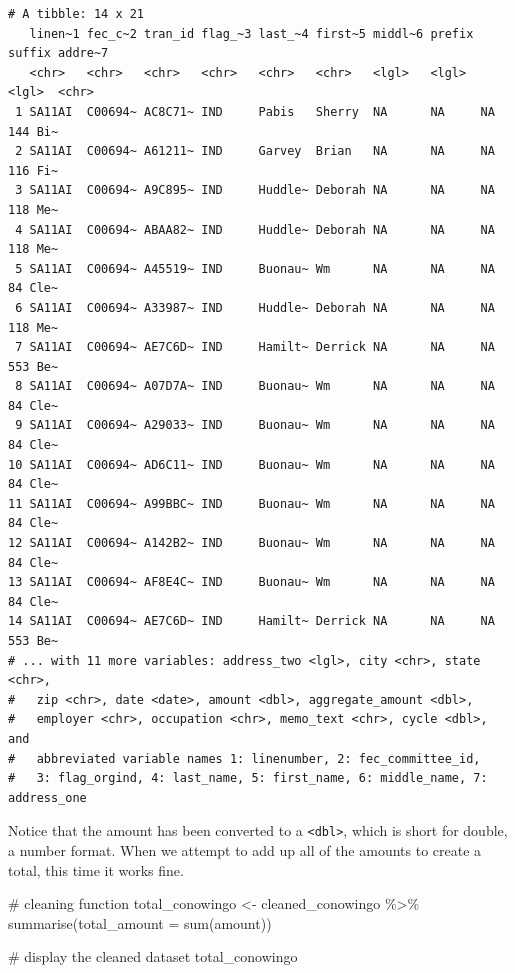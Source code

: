 \documentclass[
  letterpaper,
  DIV=11,
  numbers=noendperiod]{scrreprt}
\newenvironment{Shaded}{\begin{snugshade}}{\end{snugshade}}
\newcommand{\AttributeTok}[1]{\textcolor[rgb]{0.40,0.45,0.13}{#1}}
\newcommand{\CommentTok}[1]{\textcolor[rgb]{0.37,0.37,0.37}{#1}}
\newcommand{\FunctionTok}[1]{\textcolor[rgb]{0.28,0.35,0.67}{#1}}
\newcommand{\NormalTok}[1]{\textcolor[rgb]{0.00,0.23,0.31}{#1}}
\newcommand{\OtherTok}[1]{\textcolor[rgb]{0.00,0.23,0.31}{#1}}
\newcommand{\SpecialCharTok}[1]{\textcolor[rgb]{0.37,0.37,0.37}{#1}}
\begin{document}
\begin{verbatim}
# A tibble: 14 x 21
   linen~1 fec_c~2 tran_id flag_~3 last_~4 first~5 middl~6 prefix suffix addre~7
   <chr>   <chr>   <chr>   <chr>   <chr>   <chr>   <lgl>   <lgl>  <lgl>  <chr>  
 1 SA11AI  C00694~ AC8C71~ IND     Pabis   Sherry  NA      NA     NA     144 Bi~
 2 SA11AI  C00694~ A61211~ IND     Garvey  Brian   NA      NA     NA     116 Fi~
 3 SA11AI  C00694~ A9C895~ IND     Huddle~ Deborah NA      NA     NA     118 Me~
 4 SA11AI  C00694~ ABAA82~ IND     Huddle~ Deborah NA      NA     NA     118 Me~
 5 SA11AI  C00694~ A45519~ IND     Buonau~ Wm      NA      NA     NA     84 Cle~
 6 SA11AI  C00694~ A33987~ IND     Huddle~ Deborah NA      NA     NA     118 Me~
 7 SA11AI  C00694~ AE7C6D~ IND     Hamilt~ Derrick NA      NA     NA     553 Be~
 8 SA11AI  C00694~ A07D7A~ IND     Buonau~ Wm      NA      NA     NA     84 Cle~
 9 SA11AI  C00694~ A29033~ IND     Buonau~ Wm      NA      NA     NA     84 Cle~
10 SA11AI  C00694~ AD6C11~ IND     Buonau~ Wm      NA      NA     NA     84 Cle~
11 SA11AI  C00694~ A99BBC~ IND     Buonau~ Wm      NA      NA     NA     84 Cle~
12 SA11AI  C00694~ A142B2~ IND     Buonau~ Wm      NA      NA     NA     84 Cle~
13 SA11AI  C00694~ AF8E4C~ IND     Buonau~ Wm      NA      NA     NA     84 Cle~
14 SA11AI  C00694~ AE7C6D~ IND     Hamilt~ Derrick NA      NA     NA     553 Be~
# ... with 11 more variables: address_two <lgl>, city <chr>, state <chr>,
#   zip <chr>, date <date>, amount <dbl>, aggregate_amount <dbl>,
#   employer <chr>, occupation <chr>, memo_text <chr>, cycle <dbl>, and
#   abbreviated variable names 1: linenumber, 2: fec_committee_id,
#   3: flag_orgind, 4: last_name, 5: first_name, 6: middle_name, 7: address_one
\end{verbatim}

Notice that the amount has been converted to a
\texttt{\textless{}dbl\textgreater{}}, which is short for double, a
number format. When we attempt to add up all of the amounts to create a
total, this time it works fine.

\begin{Shaded}
\begin{Highlighting}[]
\CommentTok{\# cleaning function}
\NormalTok{total\_conowingo }\OtherTok{\textless{}{-}}\NormalTok{ cleaned\_conowingo }\SpecialCharTok{\%\textgreater{}\%}
  \FunctionTok{summarise}\NormalTok{(}\AttributeTok{total\_amount =} \FunctionTok{sum}\NormalTok{(amount))}

\CommentTok{\# display the cleaned dataset}
\NormalTok{total\_conowingo}
\end{Highlighting}
\end{Shaded}
\end{document}
